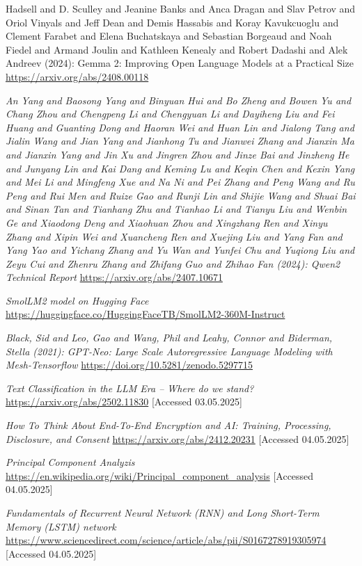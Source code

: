 \documentclass[licencjacka,en]{pracamgr}
\begin{document}
\begin{thebibliography}{199}
{Hadsell and D. Sculley and Jeanine Banks and Anca Dragan and Slav Petrov and Oriol Vinyals and Jeff Dean and Demis Hassabis and Koray Kavukcuoglu and Clement Farabet and Elena Buchatskaya and Sebastian Borgeaud and Noah Fiedel and Armand Joulin and Kathleen Kenealy and Robert Dadashi and Alek Andreev (2024): Gemma 2: Improving Open Language Models at a Practical Size
}
\url{https://arxiv.org/abs/2408.00118}

\textit{An Yang and Baosong Yang and Binyuan Hui and Bo Zheng and Bowen Yu and Chang Zhou and Chengpeng Li and Chengyuan Li and Dayiheng Liu and Fei Huang and Guanting Dong and Haoran Wei and Huan Lin and Jialong Tang and Jialin Wang and Jian Yang and Jianhong Tu and Jianwei Zhang and Jianxin Ma and Jianxin Yang and Jin Xu and Jingren Zhou and Jinze Bai and Jinzheng He and Junyang Lin and Kai Dang and Keming Lu and Keqin Chen and Kexin Yang and Mei Li and Mingfeng Xue and Na Ni and Pei Zhang and Peng Wang and Ru Peng and Rui Men and Ruize Gao and Runji Lin and Shijie Wang and Shuai Bai and Sinan Tan and Tianhang Zhu and Tianhao Li and Tianyu Liu and Wenbin Ge and Xiaodong Deng and Xiaohuan Zhou and Xingzhang Ren and Xinyu Zhang and Xipin Wei and Xuancheng Ren and Xuejing Liu and Yang Fan and Yang Yao and Yichang Zhang and Yu Wan and Yunfei Chu and Yuqiong Liu and Zeyu Cui and Zhenru Zhang and Zhifang Guo and Zhihao Fan (2024): Qwen2 Technical Report}
\url{https://arxiv.org/abs/2407.10671}

\textit{SmolLM2 model on Hugging Face}
\url{https://huggingface.co/HuggingFaceTB/SmolLM2-360M-Instruct}

\textit{Black, Sid and Leo, Gao and Wang, Phil and Leahy, Connor and Biderman, Stella (2021): GPT-Neo: Large Scale Autoregressive Language Modeling with Mesh-Tensorflow}
\url{https://doi.org/10.5281/zenodo.5297715}

\textit{Text Classification in the LLM Era -- Where do we stand?}
\url{https://arxiv.org/abs/2502.11830}
[Accessed 03.05.2025]

\textit{How To Think About End-To-End Encryption and AI: Training, Processing, Disclosure, and Consent}
\url{https://arxiv.org/abs/2412.20231}
[Accessed 04.05.2025]

\textit{Principal Component Analyzis}
\url{https://en.wikipedia.org/wiki/Principal_component_analysis}
[Accessed 04.05.2025]

\textit{Fundamentals of Recurrent Neural Network (RNN) and Long Short-Term Memory (LSTM) network}
\url{https://www.sciencedirect.com/science/article/abs/pii/S0167278919305974}
[Accessed 04.05.2025]


\end{thebibliography}
\end{document}
